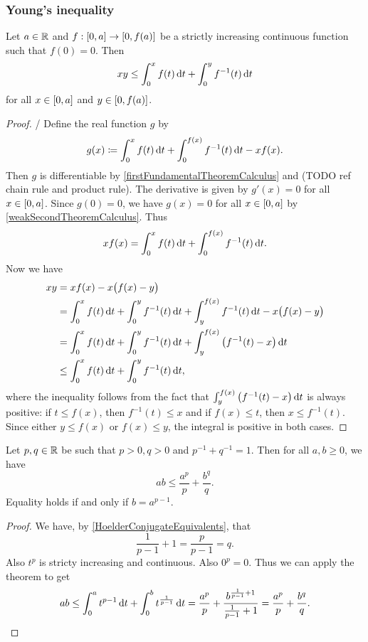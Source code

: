 \subsubsection{Young's inequality}
\begin{theorem}
Let $a\in \mathbb{R}$ and $f: \interval{0,a}\to \interval{0,f(a)}$ be a strictly increasing continuous function such that $f(0) = 0$. Then
\[ xy \leq \int_0^x f(t)\operatorname{d \!}{t} + \int_0^y f^{-1}(t)\operatorname{d \!}{t} \]
for all $x\in \interval{0,a}$ and $y\in \interval{0,f(a)}$.
\end{theorem}
\begin{proof}/
Define the real function $g$ by
\[ g(x) \coloneqq \int_0^x f(t)\operatorname{d \!}{t} + \int_0^{f(x)}f^{-1}(t)\operatorname{d \!}{t} - xf(x). \]
Then $g$ is differentiable by \ref{firstFundamentalTheoremCalculus} and (TODO ref chain rule and product rule). The derivative is given by $g'(x) = 0$ for all $x\in \interval{0,a}$. Since $g(0) = 0$, we have $g(x) = 0$ for all $x\in\interval{0,a}$ by \ref{weakSecondTheoremCalculus}. Thus
\[ xf(x) = \int_0^x f(t)\operatorname{d \!}{t} + \int_0^{f(x)}f^{-1}(t)\operatorname{d \!}{t}. \]
Now we have
\begin{align*}
xy &= xf(x) - x\big(f(x)-y\big) \\
&= \int_0^x f(t)\diff{t} + \int_0^{y}f^{-1}(t)\diff{t} + \int_y^{f(x)}f^{-1}(t)\diff{t} - x\big(f(x)-y\big) \\
&= \int_0^x f(t)\diff{t} + \int_0^{y}f^{-1}(t)\diff{t} + \int_y^{f(x)}\big(f^{-1}(t) - x\big)\diff{t} \\
&\leq \int_0^x f(t)\diff{t} + \int_0^{y}f^{-1}(t)\diff{t},
\end{align*}
where the inequality follows from the fact that $\int_y^{f(x)}\big(f^{-1}(t) - x\big)\operatorname{d \!}{t}$ is always positive: if $t \leq f(x)$, then $f^{-1}(t)\leq x$ and if $f(x)\leq t$, then $x\leq f^{-1}(t)$. Since either $y\leq f(x)$ or $f(x)\leq y$, the integral is positive in both cases.
\end{proof}
\begin{corollary} \label{YoungsInequality}
Let $p,q\in \mathbb{R}$ be such that $p>0, q>0$ and $p^{-1} + q^{-1} = 1$. Then for all $a,b \geq 0$, we have
\[ ab \leq \frac{a^p}{p} + \frac{b^q}{q}. \]
Equality holds \textup{if and only if} $b = a^{p-1}$.
\end{corollary}
\begin{proof}
We have, by \ref{HoelderConjugateEquivalents}, that
\[ \frac{1}{p-1}+1 = \frac{p}{p-1} = q. \]
Also $t^p$ is stricty increasing and continuous. Also $0^p = 0$. Thus we can apply the theorem to get
\[ ab \leq \int_0^a t^{p-1}\operatorname{d \!}{t} + \int_0^b t^{\frac{1}{p-1}}\operatorname{d \!}{t} = \frac{a^p}{p} + \frac{b^{\frac{1}{p-1}+1}}{\frac{1}{p-1}+1} = \frac{a^p}{p} + \frac{b^q}{q}. \]
\end{proof}
